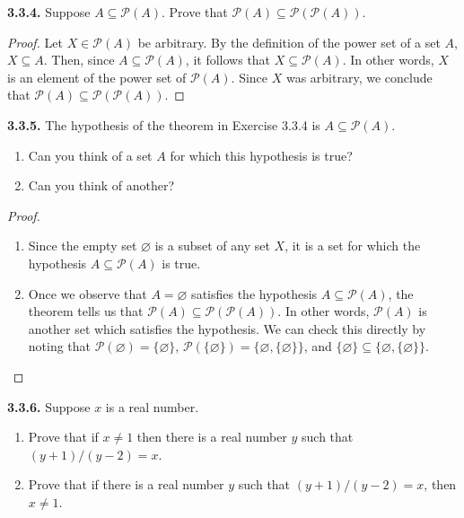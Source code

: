 \documentclass[12pt]{amsart}
\newenvironment{statement}[1]{\smallskip\noindent\color[rgb]{.6627, .3529, .6314} {\bf #1.}}{}
\theoremstyle{definition}
\theoremstyle{remark}
\newcommand{\powerset}[1]{\mathscr{P} \left( #1 \right)}
\begin{document}
\begin{statement}{3.3.4}
Suppose $A \subseteq \powerset{A}$.
Prove that $\powerset{A} \subseteq \powerset{\powerset{A}}$.
\end{statement}

\begin{proof}
Let $X \in \powerset{A}$ be arbitrary.
By the definition of the power set of a set $A$, $X \subseteq A$.
Then, since $A \subseteq \powerset{A}$, it follows that $X \subseteq \powerset{A}$.
In other words, $X$ is an element of the power set of $\powerset{A}$.
Since $X$ was arbitrary, we conclude that $\powerset{A} \subseteq \powerset{\powerset{A}}$.
\end{proof}


\begin{statement}{3.3.5}
The hypothesis of the theorem in Exercise 3.3.4 is $A \subseteq \powerset{A}$.
\begin{enumerate}
	\item Can you think of a set $A$ for which this hypothesis is true?
	
	\item Can you think of another?
\end{enumerate}
\end{statement}

\begin{proof}
\hfill
\begin{enumerate}
	\item Since the empty set $\varnothing$ is a subset of any set $X$, it is a set for which the
	hypothesis $A \subseteq \powerset{A}$ is true.
	
	\item Once we observe that $A = \varnothing$ satisfies the hypothesis
	$A \subseteq \powerset{A}$, the theorem tells us that 
	$\powerset{A} \subseteq \powerset{\powerset{A}}$.
	In other words, $\powerset{A}$ is another set which satisfies the hypothesis.
	We can check this directly by noting that $\powerset{\varnothing} = \{ \varnothing \}$,
	$\powerset{\{ \varnothing \}} = \{ \varnothing, \{ \varnothing \} \}$,
	and $\{ \varnothing \} \subseteq \{ \varnothing, \{ \varnothing \} \}$.
\end{enumerate}
\end{proof}


\begin{statement}{3.3.6}
Suppose $x$ is a real number.
\begin{enumerate}
	\item Prove that if $x \neq 1$ then there is a real number $y$ such that $(y + 1)/(y - 2) = x$.
	
	\item Prove that if there is a real number $y$ such that $(y + 1)/(y - 2) = x$, then $x \neq 1$.
\end{enumerate}
\end{statement}
\end{document}
